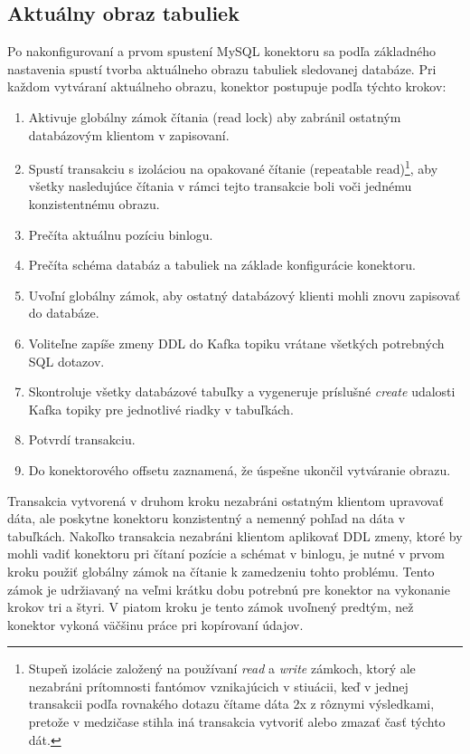 \subsection{Aktuálny obraz tabuliek} \label{debezium:conistent_snapshot}
Po nakonfigurovaní a prvom spustení MySQL konektoru sa podľa základného nastavenia spustí tvorba aktuálneho obrazu tabuliek sledovanej databáze. Pri každom vytváraní aktuálneho obrazu, konektor postupuje podľa týchto krokov\cite{debezium:consistent_snapshot}:
\begin{enumerate}
\item Aktivuje globálny zámok čítania (read lock) aby zabránil ostatným databázovým klientom v zapisovaní.
\item Spustí transakciu s izoláciou na opakované čítanie (repeatable read)\footnote{Stupeň izolácie založený na používaní \textit{read} a \textit{write} zámkoch, ktorý ale nezabráni prítomnosti fantómov vznikajúcich v stiuácii, keď v jednej transakcii podľa rovnakého dotazu čítame dáta 2x z rôznymi výsledkami, pretože v medzičase stihla iná transakcia vytvoriť alebo zmazať časť týchto dát.}, aby všetky nasledujúce čítania v rámci tejto transakcie boli voči jednému konzistentnému obrazu.
\item Prečíta aktuálnu pozíciu binlogu.
\item Prečíta schéma databáz a tabuliek na základe konfigurácie konektoru.
\item Uvoľní globálny zámok, aby ostatný databázový klienti mohli znovu zapisovať do databáze.
\item Voliteľne zapíše zmeny DDL do Kafka topiku vrátane všetkých potrebných SQL dotazov.
\item Skontroluje všetky databázové tabuľky a vygeneruje príslušné \textit{create} udalosti  Kafka topiky pre jednotlivé riadky v tabuľkách.
\item Potvrdí transakciu.
\item Do konektorového offsetu zaznamená, že úspešne ukončil vytváranie obrazu.
\end{enumerate}

Transakcia vytvorená v druhom kroku nezabráni ostatným klientom upravovať dáta, ale poskytne konektoru konzistentný a nemenný pohľad na dáta v tabuľkách. Nakoľko transakcia nezabráni klientom aplikovať DDL zmeny, ktoré by mohli vadiť konektoru pri čítaní pozície a schémat v binlogu, je nutné v prvom kroku použiť globálny zámok na čítanie k zamedzeniu tohto problému. Tento zámok je udržiavaný na veľmi krátku dobu potrebnú pre konektor na vykonanie krokov tri a štyri. V piatom kroku je tento zámok uvoľnený predtým, než konektor vykoná väčšinu práce pri kopírovaní údajov.

